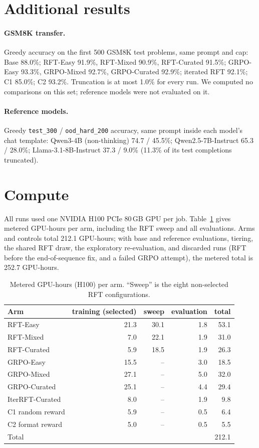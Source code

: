 \documentclass{article}
\begin{document}
\section{Additional results}
\label{app:extra}

\paragraph{GSM8K transfer.} Greedy accuracy on the first 500 GSM8K test problems, same prompt and cap: Base 88.0\%; RFT-Easy 91.9\%, RFT-Mixed 90.9\%, RFT-Curated 91.5\%; GRPO-Easy 93.3\%, GRPO-Mixed 92.7\%, GRPO-Curated 92.9\%; iterated RFT 92.1\%; C1 85.0\%; C2 93.2\%. Truncation is at most 1.0\% for every run. We computed no comparisons on this set; reference models were not evaluated on it.

\paragraph{Reference models.} Greedy \texttt{test\_300} / \texttt{ood\_hard\_200} accuracy, same prompt inside each model's chat template: Qwen3-4B (non-thinking) 74.7 / 45.5\%; Qwen2.5-7B-Instruct 65.3 / 28.0\%; Llama-3.1-8B-Instruct 37.3 / 9.0\% (11.3\% of its test completions truncated).

\section{Compute}
\label{app:compute}

All runs used one NVIDIA H100 PCIe 80\,GB GPU per job. Table~\ref{tab:compute} gives metered GPU-hours per arm, including the RFT sweep and all evaluations. Arms and controls total 212.1 GPU-hours; with base and reference evaluations, tiering, the shared RFT draw, the exploratory re-evaluation, and discarded runs (RFT before the end-of-sequence fix, and a failed GRPO attempt), the metered total is 252.7 GPU-hours.

\begin{table}[!ht]
\centering\small
\caption{Metered GPU-hours (H100) per arm. ``Sweep'' is the eight non-selected RFT configurations.}
\label{tab:compute}
\begin{tabular}{lrrrr}
\toprule
Arm & training (selected) & sweep & evaluation & total \\
\midrule
RFT-Easy        & 21.3 & 30.1 & 1.8 & 53.1 \\
RFT-Mixed       & 7.0  & 22.1 & 1.9 & 31.0 \\
RFT-Curated     & 5.9  & 18.5 & 1.9 & 26.3 \\
GRPO-Easy       & 15.5 & --   & 3.0 & 18.5 \\
GRPO-Mixed      & 27.1 & --   & 5.0 & 32.0 \\
GRPO-Curated    & 25.1 & --   & 4.4 & 29.4 \\
IterRFT-Curated & 8.0  & --   & 1.9 & 9.8 \\
C1 random reward & 5.9 & --   & 0.5 & 6.4 \\
C2 format reward & 5.0 & --   & 0.5 & 5.5 \\
\midrule
Total           &      &      &     & 212.1 \\
\bottomrule
\end{tabular}
\end{table}
\end{document}
